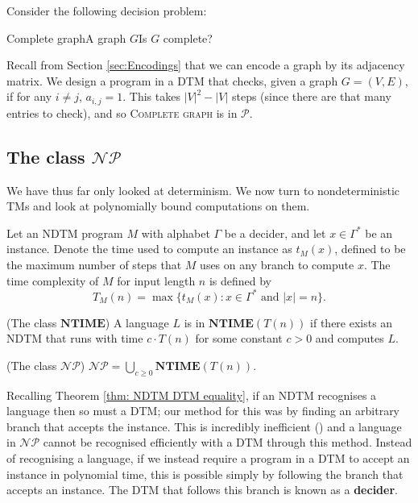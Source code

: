 \begin{example}
    Consider the following decision problem:
    
    \begin{decisionproblem}{Complete graph}{A graph $G$}{Is $G$ complete?}
    \end{decisionproblem}

    Recall from Section \ref{sec:Encodings} that we can encode a graph by its adjacency matrix. We design a program in a DTM that checks, given a graph $G=(V,E)$, if for any $i \neq j$, $a_{i,j} = 1$. This takes $|V|^2 - |V|$ steps (since there are that many entries to check), and so \textsc{Complete graph} is in $\mathcal{P}$.
\end{example}

\subsection{The class $\mathcal{NP}$}
We have thus far only looked at determinism. We now turn to nondeterministic TMs and look at polynomially bound computations on them.

\begin{definition}
    Let an NDTM program $M$ with alphabet $\Gamma$ be a decider, and let $x \in \Gamma^*$ be an instance. Denote the time used to compute an instance as $t_M(x)$, defined to be the maximum number of steps that $M$ uses on any branch to compute $x$. The time complexity of $M$ for input length $n$ is defined by \[T_M(n) = \max\{t_M(x): x \in \Gamma^* \text{ and } |x| = n\} \text {.}\]
\end{definition}

\begin{definition}
    (The class $\mathbf{NTIME}$) A language $L$ is in $\mathbf{NTIME}(T(n))$ if there exists an NDTM that runs with time $c \cdot T(n)$ for some constant $c>0$ and computes $L$.
\end{definition}

\begin{definition}
    (The class $\mathcal{NP}$) $\mathcal{NP} = \bigcup_{c \geq 0} \mathbf{NTIME}(T(n))$.
\end{definition}

Recalling Theorem \ref{thm: NDTM DTM equality}, if an NDTM recognises a language then so must a DTM; our method for this was by finding an arbitrary branch that accepts the instance. This is incredibly inefficient (\cite{SipserMichael2013Ittt}) and a language in $\mathcal{NP}$ cannot be recognised efficiently with a DTM through this method. Instead of recognising a language, if we instead require a program in a DTM to accept an instance in polynomial time, this is possible simply by following the branch that accepts an instance. The DTM that follows this branch is known as a \textbf{decider}.

